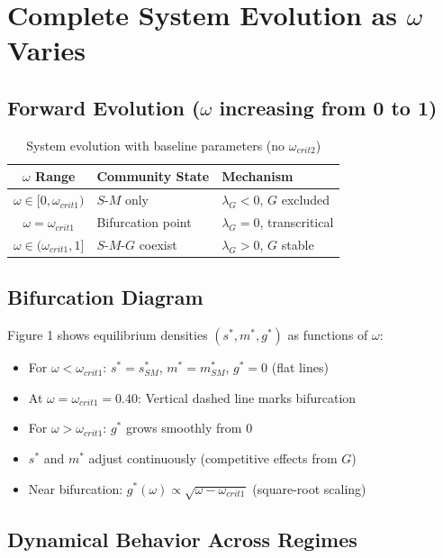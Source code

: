 \documentclass[11pt]{article}
\begin{document}
\section{Complete System Evolution as $\omega$ Varies}

\subsection{Forward Evolution ($\omega$ increasing from 0 to 1)}

\begin{table}[h]
\centering
\begin{tabular}{cll}
\toprule
\textbf{$\omega$ Range} & \textbf{Community State} & \textbf{Mechanism} \\
\midrule
$\omega \in [0, \omega_{crit1})$ & $S$-$M$ only & $\lambda_G < 0$, $G$ excluded \\
$\omega = \omega_{crit1}$ & Bifurcation point & $\lambda_G = 0$, transcritical \\
$\omega \in (\omega_{crit1}, 1]$ & $S$-$M$-$G$ coexist & $\lambda_G > 0$, $G$ stable \\
\bottomrule
\end{tabular}
\caption{System evolution with baseline parameters (no $\omega_{crit2}$)}
\end{table}

\subsection{Bifurcation Diagram}

Figure 1 shows equilibrium densities $(s^*, m^*, g^*)$ as functions of $\omega$:

\begin{itemize}
    \item For $\omega < \omega_{crit1}$: $s^* = s^*_{SM}$, $m^* = m^*_{SM}$, $g^* = 0$ (flat lines)
    \item At $\omega = \omega_{crit1} = 0.40$: Vertical dashed line marks bifurcation
    \item For $\omega > \omega_{crit1}$: $g^*$ grows smoothly from 0
    \item $s^*$ and $m^*$ adjust continuously (competitive effects from $G$)
    \item Near bifurcation: $g^*(\omega) \propto \sqrt{\omega - \omega_{crit1}}$ (square-root scaling)
\end{itemize}

\subsection{Dynamical Behavior Across Regimes}
\end{document}
